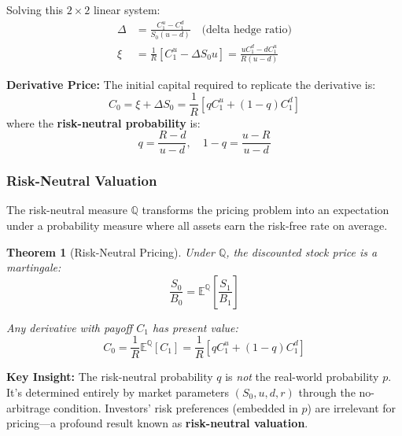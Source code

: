 \documentclass[10pt,twocolumn]{article}
\newtheorem{theorem}{Theorem}
\begin{document}
Solving this $2 \times 2$ linear system:
\begin{align}
\Delta &= \frac{C_1^u - C_1^d}{S_0(u - d)} \quad \text{(delta hedge ratio)}\\
\xi &= \frac{1}{R}\left[C_1^u - \Delta S_0 u\right] = \frac{uC_1^d - dC_1^u}{R(u-d)}
\end{align}

\begin{resultbox}
\textbf{Derivative Price:} The initial capital required to replicate the derivative is:
\begin{equation}
C_0 = \xi + \Delta S_0 = \frac{1}{R}\left[qC_1^u + (1-q)C_1^d\right]
\end{equation}
where the \textbf{risk-neutral probability} is:
\begin{equation}
q = \frac{R - d}{u - d}, \quad 1-q = \frac{u - R}{u - d}
\end{equation}
\end{resultbox}

\subsubsection{Risk-Neutral Valuation}

The risk-neutral measure $\mathbb{Q}$ transforms the pricing problem into an expectation under a probability measure where all assets earn the risk-free rate on average.

\begin{theorem}[Risk-Neutral Pricing]
Under $\mathbb{Q}$, the discounted stock price is a martingale:
\begin{equation}
\frac{S_0}{B_0} = \mathbb{E}^\mathbb{Q}\left[\frac{S_1}{B_1}\right]
\end{equation}

Any derivative with payoff $C_1$ has present value:
\begin{equation}
C_0 = \frac{1}{R}\mathbb{E}^\mathbb{Q}[C_1] = \frac{1}{R}\left[qC_1^u + (1-q)C_1^d\right]
\end{equation}
\end{theorem}

\begin{notebox}
\textbf{Key Insight:} The risk-neutral probability $q$ is \emph{not} the real-world probability $p$. It's determined entirely by market parameters $(S_0, u, d, r)$ through the no-arbitrage condition. Investors' risk preferences (embedded in $p$) are irrelevant for pricing---a profound result known as \textbf{risk-neutral valuation}.
\end{notebox}
\end{document}
